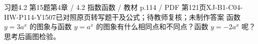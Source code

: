 \par\noindent\begin{minipage}{\linewidth}
\begin{bankitem}{习题4.2 第15题}{第4章 / 4.2 指数函数 / 教材 p.114 / PDF 第121页}{XJ-B1-C04-HW-P114-Y1507}{已对照原页转写题干及公式；待教师复核；未制作答案}
函数 $y=3a^x$ 的图象与函数 $y=a^x$ 的图象有什么相同点和不同点？函数 $y=-2a^x$ 呢？思考后画图检验。
\end{bankitem}
\end{minipage}\par\medskip
